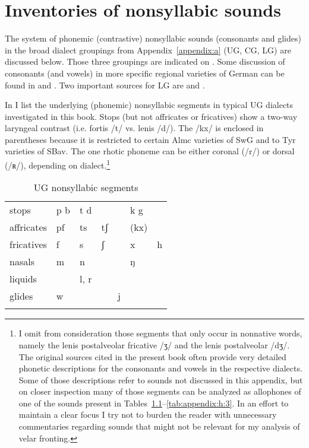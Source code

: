 \chapter{Inventories of nonsyllabic sounds}\label{appendix:h}

The system of phonemic (contrastive) nonsyllabic sounds (consonants and glides) in the broad dialect groupings from Appendix~\ref{appendix:a} (UG, CG, LG) are discussed below. Those three groupings are indicated on . Some discussion of consonants (and vowels) in more specific regional varieties of German can be found in \citet{Keller1961} and \citet{Russ1989}. Two important sources for LG are \citet{Sarauw1921} and \citet{Foerste1957}.

In  I list the underlying (phonemic) nonsyllabic segments in typical UG dialects investigated in this book. Stops (but not affricates or fricatives) show a two-way laryngeal contrast (i.e. fortis /t/ vs. lenis /d/). The  /kx/ is enclosed in parentheses because it is restricted to certain Almc varieties of SwG and to Tyr varieties of SBav. The one rhotic phoneme can be either coronal (/r/) or dorsal (/ʀ/), depending on dialect.\footnote{I omit from consideration those segments that only occur in nonnative words, namely the lenis postalveolar fricative /ʒ/ and the lenis postalveolar  /dʒ/. The original sources cited in the present book often provide very detailed phonetic descriptions for the consonants and vowels in the respective dialects. Some of those descriptions refer to sounds not discussed in this appendix, but on closer inspection many of those segments can be analyzed as allophones of one of the sounds present in Tables~\ref{tab:appendix:h:1}--\ref{tab:appendix:h:3}. In an effort to maintain a clear focus I try not to burden the reader with unnecessary commentaries regarding sounds that might not be relevant for my analysis of velar fronting.}

\begin{table}%
\caption{\label{tab:appendix:h:1}UG nonsyllabic segments}
\begin{tabularx}{.8\textwidth}{lXXXXXX}
\lsptoprule
stops & p b & t d &  &  & k g & \\
affricates & pf & ts & tʃ &  & (kx) & \\
fricatives & f & s & ʃ &  & x & h\\
nasals & m & n &  &  & ŋ & \\
liquids &  & l, r &  &  &  & \\
glides & w &  &  & j &  & \\
\lspbottomrule
\end{tabularx}
\end{table}

